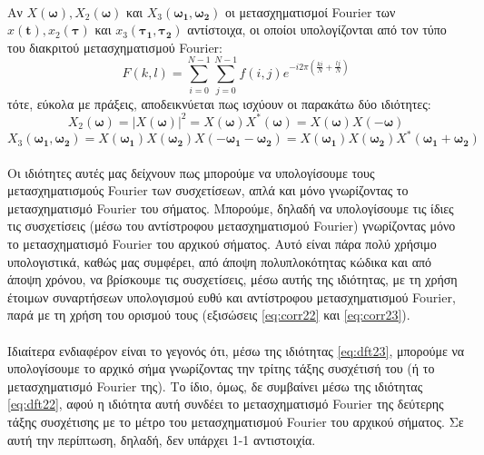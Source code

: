 \paragraph*{}
Αν $X(\boldsymbol{\omega}), X_2(\boldsymbol{\omega})$ και $X_3(\boldsymbol{\omega_1},\boldsymbol{\omega_2})$ οι μετασχηματισμοί Fourier των $x(\textbf{t}), x_2(\boldsymbol{\tau})$ και $x_3(\boldsymbol{\tau_1},\boldsymbol{\tau_2})$ αντίστοιχα, οι οποίοι υπολογίζονται από τον τύπο του διακριτού μετασχηματισμού Fourier:
\begin{equation}
F(k,l) = \sum_{i=0}^{N-1}\sum_{j=0}^{N-1}f(i,j)e^{-i2\pi\left(\frac{ki}{N}+\frac{lj}{N}\right)}
\end{equation}
τότε, εύκολα με πράξεις, αποδεικνύεται πως ισχύουν οι παρακάτω δύο ιδιότητες:
\begin{equation} \label{eq:dft22}
X_2(\boldsymbol{\omega}) = |X(\boldsymbol{\omega})|^2 = X(\boldsymbol{\omega})X^*(\boldsymbol{\omega}) = X(\boldsymbol{\omega})X(-\boldsymbol{\omega})
\end{equation}
\begin{equation}\label{eq:dft23}
X_3(\boldsymbol{\omega_1},\boldsymbol{\omega_2}) = X(\boldsymbol{\omega_1})X(\boldsymbol{\omega_2})X(-\boldsymbol{\omega_1} -\boldsymbol{\omega_2}) = X(\boldsymbol{\omega_1})X(\boldsymbol{\omega_2})X^*(\boldsymbol{\omega_1} +\boldsymbol{\omega_2})
\end{equation}
\\Οι ιδιότητες αυτές μας δείχνουν πως μπορούμε να υπολογίσουμε τους μετασχηματισμούς Fourier των συσχετίσεων, απλά και μόνο γνωρίζοντας το μετασχηματισμό Fourier του σήματος. Μπορούμε, δηλαδή να υπολογίσουμε τις ίδιες τις συσχετίσεις (μέσω του αντίστροφου μετασχηματισμού Fourier) γνωρίζοντας μόνο το μετασχηματισμό Fourier του αρχικού σήματος. Αυτό είναι πάρα πολύ χρήσιμο υπολογιστικά, καθώς μας συμφέρει, από άποψη πολυπλοκότητας κώδικα και από άποψη χρόνου, να βρίσκουμε τις συσχετίσεις, μέσω αυτής της ιδιότητας, με τη χρήση έτοιμων συναρτήσεων υπολογισμού ευθύ και αντίστροφου μετασχηματισμού Fourier, παρά με τη χρήση του ορισμού τους (εξισώσεις \ref{eq:corr22} και \ref{eq:corr23}).
\paragraph*{}
Ιδιαίτερα ενδιαφέρον είναι το γεγονός ότι, μέσω της ιδιότητας \ref{eq:dft23}, μπορούμε να υπολογίσουμε το αρχικό σήμα γνωρίζοντας την τρίτης τάξης συσχέτισή του (ή το μετασχηματισμό Fourier της). Το ίδιο, όμως, δε συμβαίνει μέσω της ιδιότητας \ref{eq:dft22}, αφού η ιδιότητα αυτή συνδέει το μετασχηματισμό Fourier της δεύτερης τάξης συσχέτισης με το μέτρο του μετασχηματισμού Fourier του αρχικού σήματος. Σε αυτή την περίπτωση, δηλαδή, δεν υπάρχει 1-1 αντιστοιχία.

